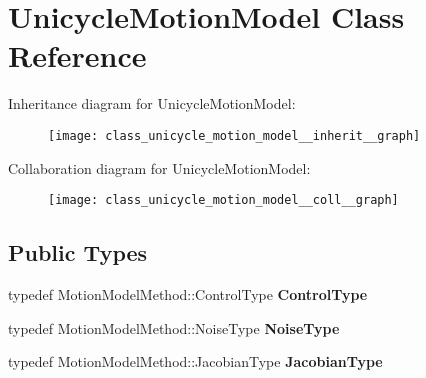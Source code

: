 \hypertarget{class_unicycle_motion_model}{\section{\-Unicycle\-Motion\-Model \-Class \-Reference}
\label{class_unicycle_motion_model}
}


\-Inheritance diagram for \-Unicycle\-Motion\-Model\-:\nopagebreak
\begin{figure}[H]
\begin{center}
\leavevmode
\texttt{[image: class\_unicycle\_motion\_model\_\_inherit\_\_graph]}
\end{center}
\end{figure}


\-Collaboration diagram for \-Unicycle\-Motion\-Model\-:\nopagebreak
\begin{figure}[H]
\begin{center}
\leavevmode
\texttt{[image: class\_unicycle\_motion\_model\_\_coll\_\_graph]}
\end{center}
\end{figure}
\subsection*{\-Public \-Types}
\begin{DoxyCompactItemize}
\item 
\hypertarget{class_unicycle_motion_model_add1e93839ad31a6b054551b31c6747ea}{typedef \*
\-Motion\-Model\-Method\-::\-Control\-Type {\bfseries \-Control\-Type}}\label{class_unicycle_motion_model_add1e93839ad31a6b054551b31c6747ea}

\item 
\hypertarget{class_unicycle_motion_model_a08ee5aeadfc71eaa00720bd56af71dfd}{typedef \*
\-Motion\-Model\-Method\-::\-Noise\-Type {\bfseries \-Noise\-Type}}\label{class_unicycle_motion_model_a08ee5aeadfc71eaa00720bd56af71dfd}

\item 
\hypertarget{class_unicycle_motion_model_aa7338364013e6001f926aa2a77f41df6}{typedef \*
\-Motion\-Model\-Method\-::\-Jacobian\-Type {\bfseries \-Jacobian\-Type}}\label{class_unicycle_motion_model_aa7338364013e6001f926aa2a77f41df6}

\end{DoxyCompactItemize}
